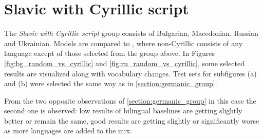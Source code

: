 \cleardoublepage

\section{Slavic with Cyrillic script}
\label{section:cyrillic_group}

The \textit{Slavic with Cyrillic script} group consists of
Bulgarian, Macedonian, Russian and Ukrainian.
Models  are compared to ,
where non-Cyrillic consists of any language except of those selected from the group above.
In Figures \ref{fig:bg_random_vs_cyrillic} and \ref{fig:ru_random_vs_cyrillic},
some selected results are visualized along with vocabulary changes.
Test sets for subfigures (a) and (b) were
selected the same way as in \cref{section:germanic_group}.

From the two opposite observations of \ref{section:germanic_group} in this case
the second one is observed: low results of bilingual baselines
are getting slightly better or remain the same,
good results are getting slightly or significantly worse as more languages are
added to the mix.

